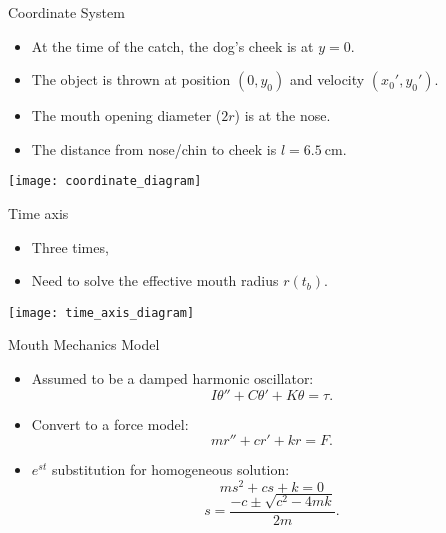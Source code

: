 \documentclass[compress,12pt,mp]{beamer}
\begin{document}
\begin{frame}[t]{Coordinate System}
\begin{itemize}
\item At the time of the catch, the dog's cheek is at $y=0$.  
\item The object is thrown at position $(0, y_0)$ and velocity $(x_0', y_0')$.
\item The mouth opening diameter ($2r$) is at the nose.
\item The distance from nose/chin to cheek is $l=\qty{6.5}{\cm}$.
\end{itemize}
\begin{center}
\texttt{[image: coordinate\_diagram]}
\end{center}

\end{frame}

\begin{frame}[t]{Time axis}
\begin{itemize}
\item Three times,
\item Need to solve the effective mouth radius $r(t_b)$.     %
\end{itemize}
\begin{center}
\texttt{[image: time\_axis\_diagram]}
\end{center}


\end{frame}

\begin{frame}[t]{Mouth Mechanics Model}
\begin{itemize}
    \item Assumed to be a damped harmonic oscillator: 
    \[I\theta'' + C\theta'+K\theta=\tau.\]
    \item Convert to a force model: %
    \[mr''+cr'+kr=F.\]
    \item \(e^{st}\) substitution for homogeneous solution:
    \[ms^2+cs+k=0\]
    \[s=\frac{-c\pm\sqrt{c^2-4mk}}{2m}.\]
    
\end{itemize}
\end{frame}
\end{document}
